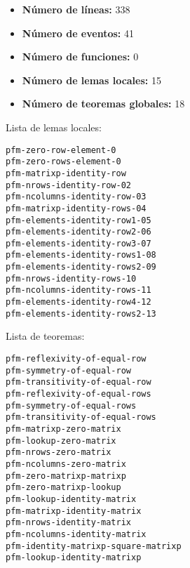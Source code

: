 \documentclass[a4paper,10pt]{article}
\begin{document}
\par \vspace{10pt}

\begin{itemize}
	\item \textbf{Número de líneas:} 338
	\item \textbf{Número de eventos:} 41
	\item \textbf{Número de funciones:} 0
	\item \textbf{Número de lemas locales:} 15
	\item \textbf{Número de teoremas globales:} 18
\end{itemize}

\par \vspace{10pt}

Lista de lemas locales:

\par \vspace{10pt}

\begin{lstlisting}[language=clips]
pfm-zero-row-element-0
pfm-zero-rows-element-0
pfm-matrixp-identity-row
pfm-nrows-identity-row-02
pfm-ncolumns-identity-row-03
pfm-matrixp-identity-rows-04
pfm-elements-identity-row1-05
pfm-elements-identity-row2-06
pfm-elements-identity-row3-07
pfm-elements-identity-rows1-08
pfm-elements-identity-rows2-09
pfm-nrows-identity-rows-10
pfm-ncolumns-identity-rows-11
pfm-elements-identity-row4-12
pfm-elements-identity-rows2-13
\end{lstlisting}

\par \vspace{10pt}

Lista de teoremas:

\par \vspace{10pt}

\begin{lstlisting}[language=clips]
pfm-reflexivity-of-equal-row
pfm-symmetry-of-equal-row
pfm-transitivity-of-equal-row
pfm-reflexivity-of-equal-rows
pfm-symmetry-of-equal-rows
pfm-transitivity-of-equal-rows
pfm-matrixp-zero-matrix
pfm-lookup-zero-matrix
pfm-nrows-zero-matrix
pfm-ncolumns-zero-matrix
pfm-zero-matrixp-matrixp  
pfm-zero-matrixp-lookup
pfm-lookup-identity-matrix
pfm-matrixp-identity-matrix
pfm-nrows-identity-matrix
pfm-ncolumns-identity-matrix
pfm-identity-matrixp-square-matrixp
pfm-lookup-identity-matrixp
\end{lstlisting}
\end{document}
